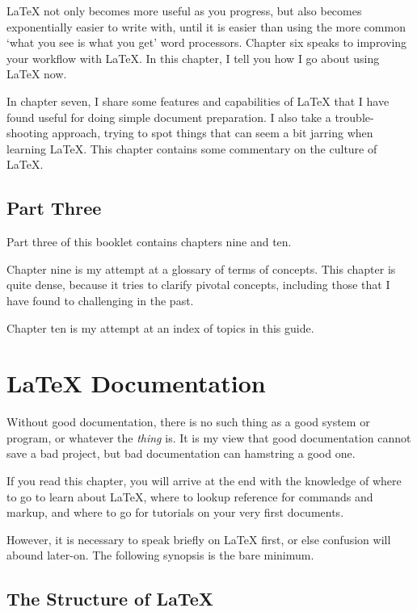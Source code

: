 \documentclass[11pt, oneside]{memoir}
\begin{document}
\LaTeX{} not only becomes more useful as you progress, but also becomes exponentially easier to write with, until it is easier than using the more common `what you see is what you get' word processors. Chapter six speaks to improving your workflow with \LaTeX{}. In this chapter, I tell you how I go about using \LaTeX{} now.

In chapter seven, I share some features and capabilities of \LaTeX{} that I have found useful for doing simple document preparation. I also take a trouble-shooting approach, trying to spot things that can seem a bit jarring when learning \LaTeX{}. This chapter contains some commentary on the culture of \LaTeX{}.

\section{Part Three}
Part three of this booklet contains chapters nine and ten.

Chapter nine is my attempt at a glossary of terms of concepts. This chapter is quite dense, because it tries to clarify pivotal concepts, including those that I have found to challenging in the past. 

Chapter ten is my attempt at an index of topics in this guide.

\chapter{\LaTeX{} Documentation}
Without good documentation, there is no such thing as a good system or program, or whatever the \emph{thing} is. It is my view that good documentation cannot save a bad project, but bad documentation can hamstring a good one.

If you read this chapter, you will arrive at the end with the knowledge of where to go to learn about LaTeX, where to lookup reference for commands and markup, and where to go for tutorials on your very first documents.

However, it is necessary to speak briefly on LaTeX first, or else confusion will abound later-on. The following synopsis is the bare minimum.

\section{The Structure of \LaTeX{}}
\end{document}
